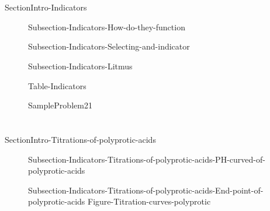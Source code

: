 \documentclass[main.tex]{subfiles}
\newcommand\chapterlabel{Ch-acidbase}\setcounter{figurenewcounter}{0}\setcounter{tablenewcounter}{0}\setcounter{formulanewcounter}{0}
\begin{document}
  \section{\color{blue!30!black}{Indicators}}{SectionIntro-Indicators}
\sloppy\begin{description}
\item[] {Subsection-Indicators-How-do-they-function}
\item[] {Subsection-Indicators-Selecting-and-indicator}
   \item[] {Subsection-Indicators-Litmus}

  \vspace{0cm} \hspace{-4cm} {Table-Indicators} 

   {SampleProblem21}

 \end{description}
 
 
  \section{\color{blue!30!black}{Titrations of polyprotic acids}}{SectionIntro-Titrations-of-polyprotic-acids}
\sloppy\begin{description}
\item[] {Subsection-Indicators-Titrations-of-polyprotic-acids-PH-curved-of-polyprotic-acids}
\item[] {Subsection-Indicators-Titrations-of-polyprotic-acids-End-point-of-polyprotic-acids}
  {Figure-Titration-curves-polyprotic}

 \end{description}
 
\end{document}
